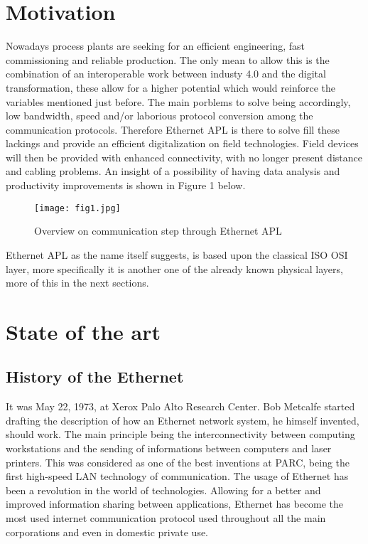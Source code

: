\documentclass[conference]{IEEEtran}
\begin{document}
\section{Motivation}
Nowadays process plants are seeking for an efficient engineering, fast commissioning and reliable production. The only mean to allow this is the combination of an interoperable work between industy 4.0 and the digital transformation, these allow for a higher potential which would reinforce the variables mentioned just before. The main porblems to solve being accordingly, low bandwidth, speed and/or laborious protocol conversion among the communication protocols. Therefore Ethernet APL is there to solve fill these lackings and provide an efficient digitalization on field technologies. Field devices will then be provided with enhanced connectivity, with no longer present distance and cabling problems. An insight of a possibility of having data analysis and productivity improvements is shown in Figure 1 below.\cite{b1}
\begin{figure}[htbp]
    \centerline{\texttt{[image: fig1.jpg]}}
    \caption{Overview on communication step through Ethernet APL \cite{b1}}
    \label{comm}
\end{figure}

 Ethernet APL as the name itself suggests, is based upon the classical ISO OSI layer, more specifically it is another one of the already known physical layers, more of this in the next sections. 

\section{State of the art}
\subsection{History of the Ethernet}
It was May 22, 1973, at Xerox Palo Alto Research Center. Bob Metcalfe started drafting the description of how an Ethernet network system, he himself invented, should work. The main principle being the interconnectivity between computing workstations and the sending of informations between computers and laser printers. This was considered as one of the best inventions at PARC, being the first high-speed LAN technology of communication. The usage of Ethernet has been a revolution in the world of technologies. Allowing for a better and improved information sharing between applications, Ethernet has become the most used internet communication protocol used throughout all the main corporations and even in domestic private use. \cite{b2}
\end{document}
